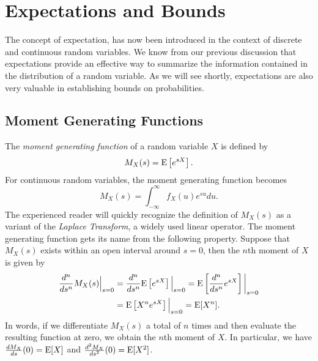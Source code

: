 \chapter{Expectations and Bounds}

The concept of expectation, has now been introduced in the context of discrete and continuous random variables.
We know from our previous discussion that expectations provide an effective way to summarize the information contained in the distribution of a random variable.
As we will see shortly, expectations are also very valuable in establishing bounds on probabilities.


\section{Moment Generating Functions}

The \emph{moment generating function} of a random variable $X$ is defined by
\begin{equation*}
M_X (s) = \mathrm{E} \left[ e^{s X} \right] .
\end{equation*}
For continuous random variables, the moment generating function becomes
\begin{equation*}
M_X (s) = \int_{-\infty}^{\infty} f_X (u) e^{s u} du .
\end{equation*}
The experienced reader will quickly recognize the definition of $M_X(s)$ as a variant of the \emph{Laplace Transform}, a widely used linear operator.
The moment generating function gets its name from the following property.
Suppose that $M_X(s)$ exists within an open interval around $s = 0$, then the $n$th moment of $X$ is given by
\begin{equation*}
\begin{split}
\frac{d^n}{ds^n} M_X (s) \Big|_{s=0}
&= \frac{d^n}{ds^n} \mathrm{E} \left[ e^{s X} \right] \Big|_{s=0}
= \mathrm{E} \left[ \frac{d^n}{ds^n} e^{s X} \right] \bigg|_{s=0} \\
&= \mathrm{E} \left[ X^n e^{s X} \right] \Big|_{s=0}
= \mathrm{E} [X^n] .
\end{split}
\end{equation*}
In words, if we differentiate $M_X(s)$ a total of $n$ times and then evaluate the resulting function at zero, we obtain the $n$th moment of $X$.
In particular, we have $\frac{d M_X}{ds}(0) = \mathrm{E} [X]$ and $\frac{d^2 M_X}{ds^2}(0) = \mathrm{E} [X^2]$.

